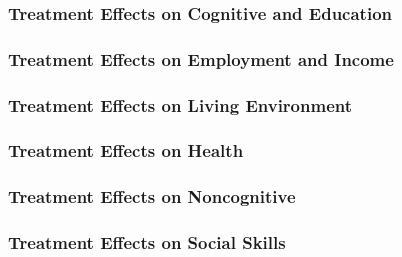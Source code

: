 \begin{appendix}
\begin{frame}
	\frametitle{Treatment Effects on Cognitive and Education} 
	\begin{table}[H]
	\scalebox{0.5}{}
	
	\end{table}
\end{frame}

\begin{frame}
	\frametitle{Treatment Effects on Employment and Income} 
	\begin{table}[H]
	\scalebox{0.45}{}
	\end{table}
\end{frame}

\begin{frame}
	\frametitle{Treatment Effects on Living Environment} 
	\begin{table}[H]
	\scalebox{0.5}{}
	\end{table}
\end{frame}

\begin{frame}
	\frametitle{Treatment Effects on Health} 
	\begin{table}[H]
	\scalebox{0.45}{}
	\end{table}
\end{frame}

\begin{frame}
	\frametitle{Treatment Effects on Noncognitive} 
	\begin{table}[H]
	\scalebox{0.5}{}
	\end{table}
\end{frame}

\begin{frame}
	\frametitle{Treatment Effects on Social Skills} 
	\begin{table}[H]
	\scalebox{0.5}{}
	\end{table}
\end{frame}

\end{appendix}